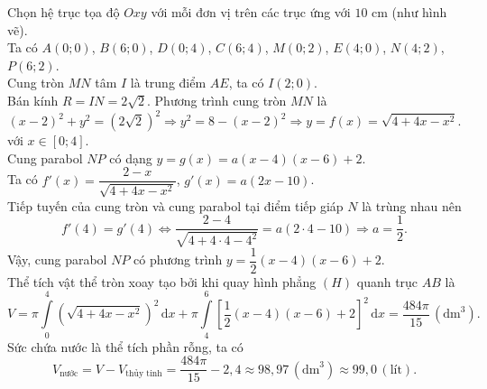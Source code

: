 \begin{ex}
{\begin{center}
		\end{center}
		Chọn hệ trục tọa độ $Oxy$ với mỗi đơn vị trên các trục ứng với $10$ cm (như hình vẽ).\\
		Ta có $A(0;0)$, $B(6;0)$, $D(0;4)$, $C(6;4)$, $M(0;2)$, $E(4;0)$, $N(4;2)$, $P(6;2)$.\\
		Cung tròn $MN$ tâm $I$ là trung điểm $AE$, ta có $I(2;0)$.\\
		Bán kính $R = IN = 2\sqrt{2}$. Phương trình cung tròn $MN$ là
		$$(x-2)^2 + y^2 = \left(2\sqrt{2}\right)^2 \Rightarrow y^2 = 8 - (x-2)^2 \Rightarrow y = f(x) = \sqrt{4 + 4x - x^2}.$$
		với $x \in [0; 4]$.\\
		Cung parabol $NP$ có dạng $y = g(x) = a(x-4)(x-6)+2$.\\
		Ta có $f'(x)= \dfrac{2-x}{\sqrt{4 + 4x - x^2}}$, $g'(x)=a(2x-10)$.\\
		Tiếp tuyến của cung tròn và cung parabol tại điểm tiếp giáp $N$ là trùng nhau nên
		$$f'(4)=g'(4)\Leftrightarrow \dfrac{2-4}{\sqrt{4 + 4\cdot 4 - 4^2}}=a(2\cdot 4-10)\Rightarrow a=\dfrac{1}{2}.$$
		Vậy, cung parabol $NP$ có phương trình $y = \dfrac{1}{2}(x-4)(x-6)+2$.\\
		Thể tích vật thể tròn xoay tạo bởi khi quay hình phẳng $(H)$ quanh trục $AB$ là
		$$V = \pi\displaystyle\int\limits_0^{4}\left(\sqrt{4 + 4x - x^2}\right)^2\mathrm{\,d}x + \pi \displaystyle\int\limits_{4}^{6}\left[\dfrac{1}{2}(x-4)(x-6)+2\right]^2\mathrm{\,d}x= \dfrac{484\pi}{15}\,\left(\mathrm{dm}^3\right).$$
		Sức chứa nước là thể tích phần rỗng, ta có
		$$V_{\text{nước}} = V - V_{\text{thủy tinh}} = \dfrac{484\pi}{15} - 2{,}4 \approx 98{,}97 \, \left(\text{dm}^3\right) \approx 99{,}0\,\left(\text{lít}\right).$$
	}
\end{ex}

